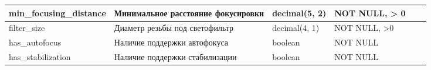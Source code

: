\documentclass{article}
\begin{document}
\begin{tabular}{ |p{4cm}|p{4cm}|p{2.5cm}|p{3.5cm}|p{2cm}|p{1cm}| }
\hline
min\_focusing\_distance             &   %
Минимальное расстояние фокусировки  &   %
decimal(5, 2)                       &   %
NOT NULL, \linebreak
> 0                                 &   %
                                    &   %
                                    \\  %
\hline
filter\_size                        &   %
Диаметр резьбы под светофильтр      &   %
decimal(4, 1)                       &   %
NOT NULL, \linebreak
>0                                  &   %
                                    &   %
                                    \\  %
\hline
has\_autofocus                      &   %
Наличие поддержки автофокуса        &   %
boolean                             &   %
NOT NULL                            &   %
                                    &   %
                                    \\  %
\hline
has\_stabilization                  &   %
Наличие поддержки стабилизации      &   %
boolean                             &   %
NOT NULL                            &   %
                                    &   %
                                    \\  %
\hline
\end{tabular}

\newpage
\end{document}
